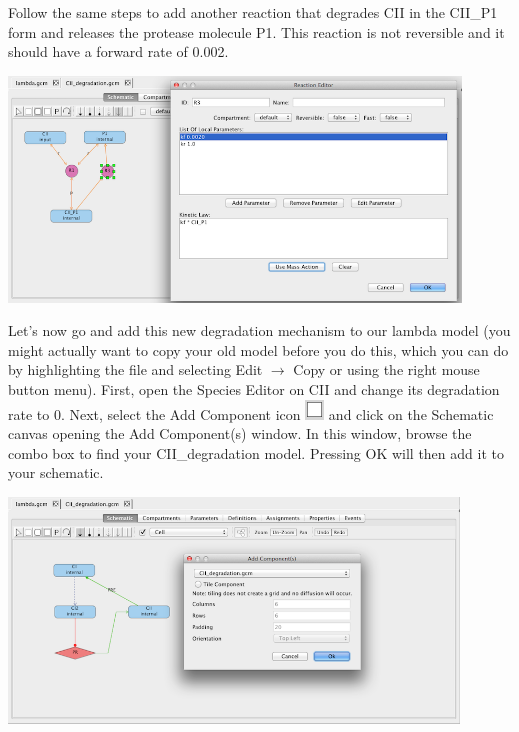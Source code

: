 \documentclass[titlepage,11pt]{article}
\begin{document}
Follow the same steps to add another reaction that degrades CII in the CII\_P1 form and releases the protease molecule P1.  This reaction is not reversible and it should have a forward rate of 0.002.

\begin{center}
\includegraphics[height=60mm]{screenshots/kineticLaw}
\end{center}

Let's now go and add this new degradation mechanism to our lambda model (you might actually want to copy your old model before you do this, which you can do by highlighting the file and selecting Edit $\rightarrow$ Copy or using the right mouse button menu).  First, open the Species Editor on CII and change its degradation rate to 0.  Next, select the Add Component icon \includegraphics{../gui/icons/modelview/add_component_selected} and click on the Schematic canvas opening the Add Component(s) window.  In this window, browse the combo box to find your CII\_degradation model.  Pressing OK will then add it to your schematic.

\begin{center}
\includegraphics[height=60mm]{screenshots/addComponent}
\end{center}
\end{document}
